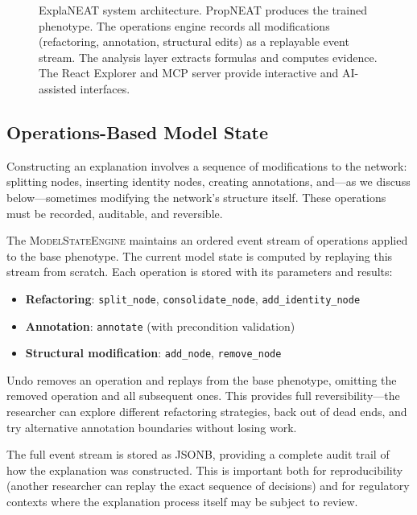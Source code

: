 \documentclass[11pt]{article}
\begin{document}
\begin{figure}[t]
    \centering
    \caption{ExplaNEAT system architecture. PropNEAT produces the trained phenotype. The operations engine records all modifications (refactoring, annotation, structural edits) as a replayable event stream. The analysis layer extracts formulas and computes evidence. The React Explorer and MCP server provide interactive and AI-assisted interfaces.}
    \label{fig:architecture}
\end{figure}

\subsection{Operations-Based Model State}

Constructing an explanation involves a sequence of modifications to the network: splitting nodes, inserting identity nodes, creating annotations, and---as we discuss below---sometimes modifying the network's structure itself. These operations must be recorded, auditable, and reversible.

The \textsc{ModelStateEngine} maintains an ordered event stream of operations applied to the base phenotype. The current model state is computed by replaying this stream from scratch. Each operation is stored with its parameters and results:

\begin{itemize}
    \item \textbf{Refactoring}: \texttt{split\_node}, \texttt{consolidate\_node}, \texttt{add\_identity\_node}
    \item \textbf{Annotation}: \texttt{annotate} (with precondition validation)
    \item \textbf{Structural modification}: \texttt{add\_node}, \texttt{remove\_node}
\end{itemize}

Undo removes an operation and replays from the base phenotype, omitting the removed operation and all subsequent ones. This provides full reversibility---the researcher can explore different refactoring strategies, back out of dead ends, and try alternative annotation boundaries without losing work.

The full event stream is stored as JSONB, providing a complete audit trail of how the explanation was constructed. This is important both for reproducibility (another researcher can replay the exact sequence of decisions) and for regulatory contexts where the explanation process itself may be subject to review.
\end{document}
